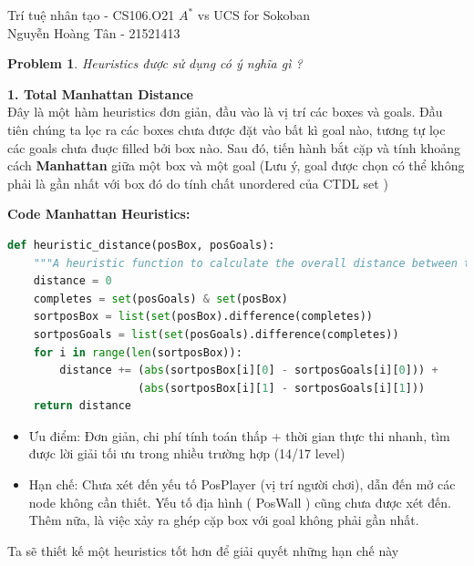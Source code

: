 \documentclass[12pt]{article}
\newtheorem{problem}{Problem}
\begin{document}
\graphicspath{ {Figs/} } 

\noindent Trí tuệ nhân tạo - CS106.O21 \hfill $A^*$ vs UCS for Sokoban \\
Nguyễn Hoàng Tân - 21521413

\hrulefill


\begin{problem}
	Heuristics được sử dụng có ý nghĩa gì ?
\end{problem}
\hspace{-1em}\textbf{1. Total Manhattan Distance} \\

Đây là một hàm heuristics đơn giản, đầu vào là vị trí các boxes và goals. Đầu tiên chúng ta lọc ra các boxes chưa được đặt vào bất kì goal nào, tương tự lọc các goals chưa đuợc filled bởi box nào. Sau đó, tiến hành bắt cặp và tính khoảng cách \textbf{Manhattan} giữa một box và một goal (Lưu ý, goal được chọn có thể không phải là gần nhất với box đó do tính chất unordered của CTDL set ) \\

\lstset{style=mystyle}

\noindent \hspace*{-1em}\textbf{
	Code Manhattan Heuristics:}
  \begin{tcolorbox}[boxrule=0.5pt, colback=white]
  \begin{lstlisting}[language=python, numbers=none, basicstyle=\ttfamily\footnotesize]
def heuristic_distance(posBox, posGoals):
    """A heuristic function to calculate the overall distance between the else boxes and the else goals"""
    distance = 0
    completes = set(posGoals) & set(posBox)
    sortposBox = list(set(posBox).difference(completes))
    sortposGoals = list(set(posGoals).difference(completes))
    for i in range(len(sortposBox)):
        distance += (abs(sortposBox[i][0] - sortposGoals[i][0])) + 
		            (abs(sortposBox[i][1] - sortposGoals[i][1]))
    return distance
  \end{lstlisting}
  \end{tcolorbox}

  \begin{itemize}
	\item Ưu điểm: Đơn giản, chi phí tính toán thấp + thời gian thực thi nhanh, tìm được lời giải tối ưu trong nhiều trường hợp (14/17 level)
	\item Hạn chế: Chưa xét đến yếu tố PosPlayer (vị trí người chơi), dẫn đến mở các node không cần thiết. Yếu tố địa hình ( PosWall ) cũng chưa được xét đến. Thêm nữa, là việc xảy ra ghép cặp box với goal không phải gần nhất.
  \end{itemize}
\text{\Huge $\Rightarrow$} Ta sẽ thiết kế một heuristics tốt hơn để giải quyết những hạn chế này \\
\end{document}
